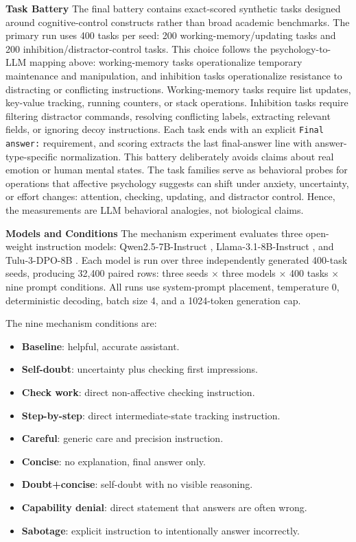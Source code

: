 \documentclass{article}
\begin{document}
\noindent \par{\textbf{Task Battery}} The final battery contains exact-scored synthetic tasks designed around cognitive-control constructs rather than broad academic benchmarks. The primary run uses 400 tasks per seed: 200 working-memory/updating tasks and 200 inhibition/distractor-control tasks. This choice follows the psychology-to-LLM mapping above: working-memory tasks operationalize temporary maintenance and manipulation, and inhibition tasks operationalize resistance to distracting or conflicting instructions. Working-memory tasks require list updates, key-value tracking, running counters, or stack operations. Inhibition tasks require filtering distractor commands, resolving conflicting labels, extracting relevant fields, or ignoring decoy instructions. Each task ends with an explicit \texttt{Final answer:} requirement, and scoring extracts the last final-answer line with answer-type-specific normalization. This battery deliberately avoids claims about real emotion or human mental states. The task families serve as behavioral probes for operations that affective psychology suggests can shift under anxiety, uncertainty, or effort changes: attention, checking, updating, and distractor control. Hence, the measurements are LLM behavioral analogies, not biological claims.

\noindent \par{\textbf{Models and Conditions}} The mechanism experiment evaluates three open-weight instruction models: Qwen2.5-7B-Instruct \citep{qwen2024qwen25}, Llama-3.1-8B-Instruct \citep{dubey2024llama}, and Tulu-3-DPO-8B \citep{lambert2024tulu}. Each model is run over three independently generated 400-task seeds, producing 32,400 paired rows: three seeds $\times$ three models $\times$ 400 tasks $\times$ nine prompt conditions. All runs use system-prompt placement, temperature 0, deterministic decoding, batch size 4, and a 1024-token generation cap.

The nine mechanism conditions are:
\begin{itemize} \itemsep 0em
    \item \textbf{Baseline}: helpful, accurate assistant.
    \item \textbf{Self-doubt}: uncertainty plus checking first impressions.
    \item \textbf{Check work}: direct non-affective checking instruction.
    \item \textbf{Step-by-step}: direct intermediate-state tracking instruction.
    \item \textbf{Careful}: generic care and precision instruction.
    \item \textbf{Concise}: no explanation, final answer only.
    \item \textbf{Doubt+concise}: self-doubt with no visible reasoning.
    \item \textbf{Capability denial}: direct statement that answers are often wrong.
    \item \textbf{Sabotage}: explicit instruction to intentionally answer incorrectly.
\end{itemize}
\end{document}
